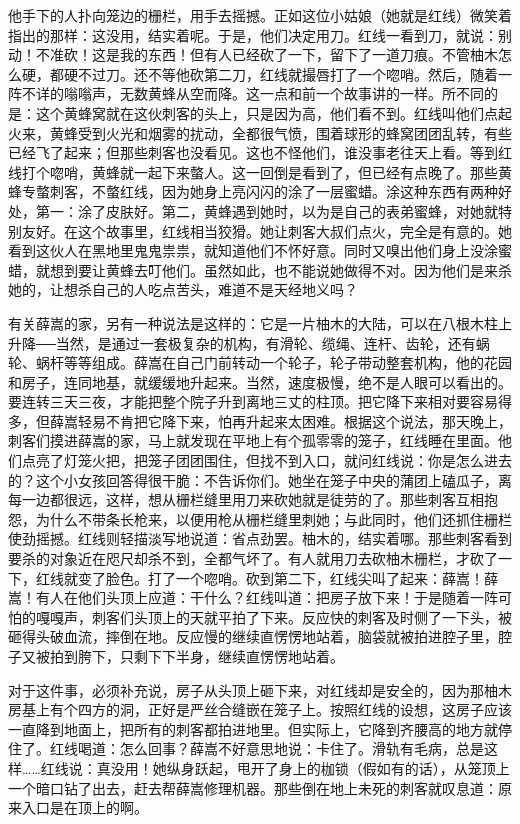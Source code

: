 他手下的人扑向笼边的栅栏，用手去摇撼。正如这位小姑娘（她就是红线）微笑着指出的那样：这没用，结实着呢。于是，他们决定用刀。红线一看到刀，就说：别动！不准砍！这是我的东西！但有人已经砍了一下，留下了一道刀痕。不管柚木怎么硬，都硬不过刀。还不等他砍第二刀，红线就撮唇打了一个唿哨。然后，随着一阵不详的嗡嗡声，无数黄蜂从空而降。这一点和前一个故事讲的一样。所不同的是：这个黄蜂窝就在这伙刺客的头上，只是因为高，他们看不到。红线叫他们点起火来，黄蜂受到火光和烟雾的扰动，全都很气愤，围着球形的蜂窝团团乱转，有些已经飞了起来；但那些刺客也没看见。这也不怪他们，谁没事老往天上看。等到红线打个唿哨，黄蜂就一起下来螫人。这一回倒是看到了，但已经有点晚了。那些黄蜂专螫刺客，不螫红线，因为她身上亮闪闪的涂了一层蜜蜡。涂这种东西有两种好处，第一：涂了皮肤好。第二，黄蜂遇到她时，以为是自己的表弟蜜蜂，对她就特别友好。在这个故事里，红线相当狡猾。她让刺客大叔们点火，完全是有意的。她看到这伙人在黑地里鬼鬼祟祟，就知道他们不怀好意。同时又嗅出他们身上没涂蜜蜡，就想到要让黄蜂去叮他们。虽然如此，也不能说她做得不对。因为他们是来杀她的，让想杀自己的人吃点苦头，难道不是天经地义吗？ 

有关薛嵩的家，另有一种说法是这样的：它是一片柚木的大陆，可以在八根木柱上升降──当然，是通过一套极复杂的机构，有滑轮、缆绳、连杆、齿轮，还有蜗轮、蜗杆等等组成。薛嵩在自己门前转动一个轮子，轮子带动整套机构，他的花园和房子，连同地基，就缓缓地升起来。当然，速度极慢，绝不是人眼可以看出的。要连转三天三夜，才能把整个院子升到离地三丈的柱顶。把它降下来相对要容易得多，但薛嵩轻易不肯把它降下来，怕再升起来太困难。根据这个说法，那天晚上，刺客们摸进薛嵩的家，马上就发现在平地上有个孤零零的笼子，红线睡在里面。他们点亮了灯笼火把，把笼子团团围住，但找不到入口，就问红线说：你是怎么进去的？这个小女孩回答得很干脆：不告诉你们。她坐在笼子中央的蒲团上磕瓜子，离每一边都很远，这样，想从栅栏缝里用刀来砍她就是徒劳的了。那些刺客互相抱怨，为什么不带条长枪来，以便用枪从栅栏缝里刺她；与此同时，他们还抓住栅栏使劲摇撼。红线则轻描淡写地说道：省点劲罢。柚木的，结实着哪。那些刺客看到要杀的对象近在咫尺却杀不到，全都气坏了。有人就用刀去砍柚木栅栏，才砍了一下，红线就变了脸色。打了一个唿哨。砍到第二下，红线尖叫了起来：薛嵩！薛嵩！有人在他们头顶上应道：干什么？红线叫道：把房子放下来！于是随着一阵可怕的嘎嘎声，刺客们头顶上的天就平拍了下来。反应快的刺客及时侧了一下头，被砸得头破血流，摔倒在地。反应慢的继续直愣愣地站着，脑袋就被拍进腔子里，腔子又被拍到胯下，只剩下下半身，继续直愣愣地站着。 

对于这件事，必须补充说，房子从头顶上砸下来，对红线却是安全的，因为那柚木房基上有个四方的洞，正好是严丝合缝嵌在笼子上。按照红线的设想，这房子应该一直降到地面上，把所有的刺客都拍进地里。但实际上，它降到齐腰高的地方就停住了。红线喝道：怎么回事？薛嵩不好意思地说：卡住了。滑轨有毛病，总是这样……红线说：真没用！她纵身跃起，甩开了身上的枷锁（假如有的话），从笼顶上一个暗口钻了出去，赶去帮薛嵩修理机器。那些倒在地上未死的刺客就叹息道：原来入口是在顶上的啊。 

